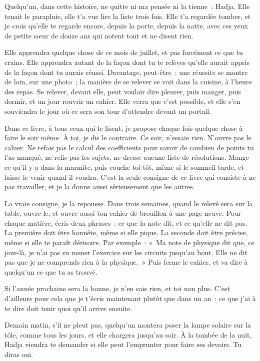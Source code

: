 \documentclass[10.5pt,twoside,openright]{book}
\begin{document}
Quelqu’un, dans cette histoire, ne quitte ni ma pensée ni la tienne : Hadja. Elle tenait le parapluie, elle t’a vue lire la liste trois fois. Elle t’a regardée tomber, et je crois qu’elle te regarde encore, depuis la porte, depuis la natte, avec ces yeux de petite sœur de douze ans qui notent tout et ne disent rien.

Elle apprendra quelque chose de ce mois de juillet, et pas forcément ce que tu crains. Elle apprendra autant de la façon dont tu te relèves qu’elle aurait appris de la façon dont tu aurais réussi. Davantage, peut-être : une réussite se montre de loin, sur une photo ; la manière de se relever se voit dans la cuisine, à l’heure des repas. Se relever, devant elle, peut vouloir dire pleurer, puis manger, puis dormir, et un jour rouvrir un cahier. Elle verra que c’est possible, et elle s’en souviendra le jour où ce sera son tour d’attendre devant un portail.

Dans ce livre, à tous ceux qui le lisent, je propose chaque fois quelque chose à faire le soir même. À toi, je dis le contraire. Ce soir, n’essaie rien. N’ouvre pas le cahier. Ne refais pas le calcul des coefficients pour savoir de combien de points tu l’as manqué, ne relis pas les sujets, ne dresse aucune liste de résolutions. Mange ce qu’il y a dans la marmite, puis couche-toi tôt, même si le sommeil tarde, et laisse-le venir quand il voudra. C’est la seule consigne de ce livre qui consiste à ne pas travailler, et je la donne aussi sérieusement que les autres.

La vraie consigne, je la repousse. Dans trois semaines, quand le relevé sera sur la table, ouvre-le, et ouvre aussi ton cahier de brouillon à une page neuve. Pour chaque matière, écris deux phrases : ce que la note dit, et ce qu’elle ne dit pas. La première doit être honnête, même si elle pique. La seconde doit être précise, même si elle te paraît dérisoire. Par exemple : « Ma note de physique dit que, ce jour-là, je n’ai pas su mener l’exercice sur les circuits jusqu’au bout. Elle ne dit pas que je ne comprends rien à la physique. » Puis ferme le cahier, et va dire à quelqu’un ce que tu as trouvé.

Si l’année prochaine sera la bonne, je n’en sais rien, et toi non plus. C’est d’ailleurs pour cela que je t’écris maintenant plutôt que dans un an : ce que j’ai à te dire doit tenir quoi qu’il arrive ensuite.

Demain matin, s’il ne pleut pas, quelqu’un montera poser la lampe solaire sur la tôle, comme tous les jours, et elle chargera jusqu’au soir. À la tombée de la nuit, Hadja viendra te demander si elle peut l’emprunter pour faire ses devoirs. Tu diras oui.
\end{document}
